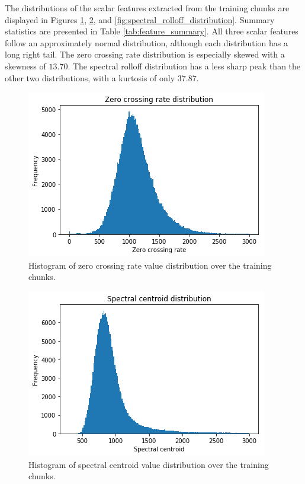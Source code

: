 \documentclass{article}
\begin{document}
The distributions of the scalar features extracted from the training chunks are displayed in Figures \ref{fig:zero_crossing_rate_distribution}, \ref{fig:spectral_centroid_distribution}, and \ref{fig:spectral_rolloff_distribution}. Summary statistics are presented in Table \ref{tab:feature_summary}. All three scalar features follow an approximately normal distribution, although each distribution has a long right tail. The zero crossing rate distribution is especially skewed with a skewness of $13.70$. The spectral rolloff distribution has a less sharp peak than the other two distributions, with a kurtosis of only $37.87$.

\begin{figure}
    \centering
    \includegraphics[width=0.67 \linewidth]{zero_crossing_rate_distribution.png}
    \caption{Histogram of zero crossing rate value distribution over the training chunks.}
    \label{fig:zero_crossing_rate_distribution}
\end{figure}

\begin{figure}
    \centering
    \includegraphics[width=0.67 \linewidth]{spectral_centroid_distribution.png}
    \caption{Histogram of spectral centroid value distribution over the training chunks.}
    \label{fig:spectral_centroid_distribution}
\end{figure}
\end{document}
